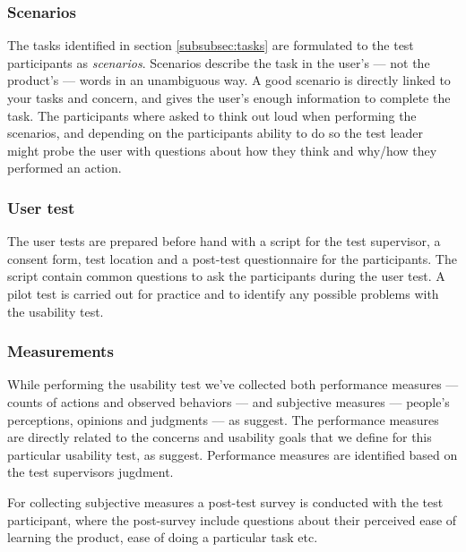 \subsubsection{Scenarios}
The tasks identified in section \ref{subsubsec:tasks} are formulated to the test participants as \textit{scenarios}. Scenarios describe the task in the user's --- not the product's --- words in an unambiguous way. A good scenario is directly linked to your tasks and concern, and gives the user's enough information to complete the task. The participants where asked to think out loud when performing the scenarios, and depending on the participants ability to do so the test leader might probe the user with questions about how they think and why/how they performed an action.

\subsubsection{User test}
The user tests are prepared before hand with a script for the test supervisor, a consent form, test location and a post-test questionnaire for the participants. The script contain common questions to ask the participants during the user test. A pilot test is carried out for practice and to identify any possible problems with the usability test.

\subsubsection{Measurements}
\label{subsubsec:measurements}
While performing the usability test we've collected both performance measures --- counts of actions and observed behaviors --- and subjective measures --- people's perceptions, opinions and judgments --- as \cite{Dumas1999} suggest.
The performance measures are directly related to the concerns and usability goals that we define for this particular usability test, as \cite{Dumas1999} suggest. Performance measures are identified based on the test supervisors jugdment.

For collecting subjective measures a post-test survey is conducted with the test participant, where the post-survey include questions about their perceived ease of learning the product, ease of doing a particular task etc.
